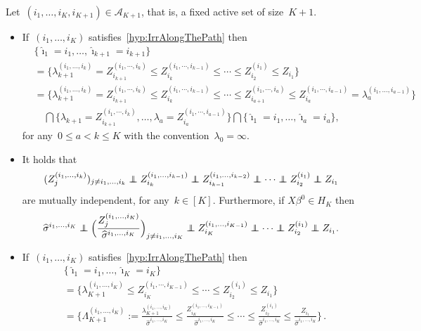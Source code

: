 \documentclass[final,numbib]{imaiai}%
\numberwithin{equation}{section}
\def\eq{\begin{equation}}
\def\qe{\end{equation}}
\renewcommand{\hat}{\widehat}
\newcommand\indep{\protect\mathpalette{\protect\independenT}{\perp}}
\def\independenT#1#2{\mathrel{\rlap{$#1#2$}\mkern2mu{#1#2}}}
\def\\bUnif{\text{\bUnif}}
\newcommand{\<}{\langle}
\renewcommand{\>}{\rangle}
\newcommand{\1}{\mathds{1}}
\begin{document}
{\begin{proposition}
\label{prop:reccur}
Let~$(i_1,\ldots,i_K,i_{K+1})\in\mathcal A_{K+1}$, that is, a fixed active set of size~$K+1$.
\begin{itemize}
\item  If~$(i_1,\ldots,i_K)$ satisfies~\eqref{hyp:IrrAlongThePath} then
\begin{align*}
&\big\{\hat \imath_1=i_1,\ldots,\hat \imath_{k+1}=i_{k+1}\big\}\\
&=\big\{
\lambda_{k+1}^{(i_1,\ldots, i_{k})}=Z_{i_{k+1}}^{(i_1,\cdots, i_{k})}
\leq
Z_{i_k}^{(i_1,\cdots, i_{k-1})}\leq\cdots\leq
Z_{i_2}^{(i_1)}\leq
Z_{i_1}\big\}\\
&
=\big\{
\lambda_{k+1}^{(i_1,\ldots, i_{k})}=Z_{i_{k+1}}^{(i_1,\cdots, i_{k})}
\leq
Z_{i_k}^{(i_1,\cdots, i_{k-1})}\leq\cdots\leq
Z_{i_{a+1}}^{(i_1,\cdots, i_{a})}\leq
Z_{i_{a}}^{(i_1,\cdots, i_{a-1})}=\lambda_{a}^{(i_1,\ldots, i_{a-1})}\big\}\\
&
\quad
\bigcap
\big\{\lambda_{k+1}=Z_{i_{k+1}}^{(i_1,\cdots, i_{k})},\ldots,\lambda_{a}=Z_{i_{a}}^{(i_1,\cdots, i_{a-1})}\big\}%
\bigcap
\big\{\hat \imath_1=i_1,\ldots,\hat \imath_{a}=i_{a}\big\},
\end{align*}
for any~$0\leq a< k\leq K$ with the convention~$\lambda_0=\infty$.
\item It holds that 
\[
(Z^{(i_1,\ldots, i_{k})}_j)_{ j\neq i_1, \ldots, i_{k}}\indep Z_{i_{k}}^{(i_1,\ldots, i_{k-1})}
\indep Z_{i_{k-1}}^{(i_1,\ldots, i_{k-2})}
\indep \cdots 
\indep Z_{i_{2}}^{(i_1)}
\indep Z_{i_1}
\]
are mutually independent, for any~$k\in[K]$. 
\newpage
Furthermore, if $X\beta^0\in H_K$ then
\eq
\label{e:indep_sigmas}
{\hat \sigma^{i_1,\ldots, i_{K}}}
\indep 
\Big(\frac{Z^{(i_1,\ldots, i_{K})}_j}{\hat \sigma^{i_1,\ldots, i_{K}}}\Big)_{ j\neq i_1, \ldots, i_{K}}
\indep {Z_{i_{K}}^{(i_1,\ldots, i_{K-1})}}
\indep \cdots 
\indep {Z_{i_{2}}^{(i_1)}}
\indep {Z_{i_1}}.
\qe
\item  If~$(i_1,\ldots,i_K)$ satisfies~\eqref{hyp:IrrAlongThePath} then %
\begin{align*}
&\big\{\hat \imath_1=i_1,\ldots,\hat \imath_{K}=i_{K}\big\}\\
&=\Big\{
\lambda_{K+1}^{(i_1,\ldots, i_{K})}
\leq
Z_{i_K}^{(i_1,\cdots, i_{K-1})}\leq\cdots\leq
Z_{i_2}^{(i_1)}\leq
Z_{i_1}\Big\}\\
&=\Bigg\{
{\Lambda_{K+1}^{(i_1,\ldots, i_{K})}:=\frac{\lambda_{K+1}^{(i_1,\ldots, i_{K})}}{\hat \sigma^{i_1,\ldots, i_{K}}}}
\leq
\frac{Z_{i_{K}}^{(i_1,\ldots, i_{K-1})}}{\hat \sigma^{i_1,\ldots, i_{K}}}
\leq\cdots\leq
\frac{Z_{i_{2}}^{(i_1)}}{\hat \sigma^{i_1,\ldots, i_{K}}}
\leq
\frac{Z_{i_1}}{\hat \sigma^{i_1,\ldots, i_{K}}}
\Bigg\}\,.
\end{align*}
\end{itemize}
\end{proposition}

}
\end{document}
